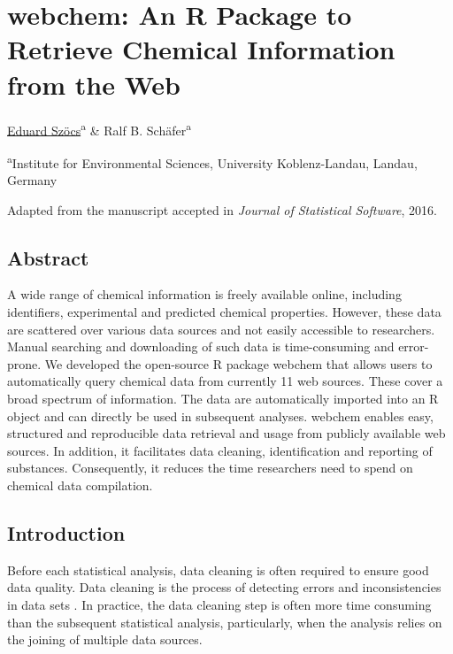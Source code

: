 

\chapter[webchem: An R Package to Retrieve Chemical Information]{webchem: An R Package to Retrieve Chemical Information from the Web}
\label{sec:webchem}  

\begin{sloppypar}
\bigskip
\underline{Eduard Szöcs}\textsuperscript{a} \& Ralf B. Schäfer\textsuperscript{a}

\bigskip
\small
\noindent 
\textsuperscript{a}Institute for Environmental Sciences, University Koblenz-Landau, Landau, Germany 

\bigskip 
\normalsize
\noindent
Adapted from the manuscript accepted in \emph{Journal of Statistical Software}, 2016.

\end{sloppypar}
\cleardoublepage


\section{Abstract}
A wide range of chemical information is freely available online, including identifiers, experimental and predicted chemical properties.
However, these data are scattered over various data sources and not easily accessible to researchers.
Manual searching and downloading of such data is time-consuming and error-prone.  
We developed the open-source R package webchem that allows users to automatically query chemical data from currently 11 web sources. 
These cover a broad spectrum of information.
The data are automatically imported into an R object and can directly be used in subsequent analyses.
webchem enables easy, structured and reproducible data retrieval and usage from publicly available web sources.
In addition, it facilitates data cleaning, identification and reporting of substances.
Consequently, it reduces the time researchers need to spend on chemical data compilation.

\section[Introduction]{Introduction}
Before each statistical analysis, data cleaning is often required to ensure good data quality.
Data cleaning is the process of detecting errors and inconsistencies in data sets \citep{Chapman_2005}.
In practice, the data cleaning step is often more time consuming than the subsequent statistical analysis, particularly, when the analysis relies on the joining of multiple data sources.

